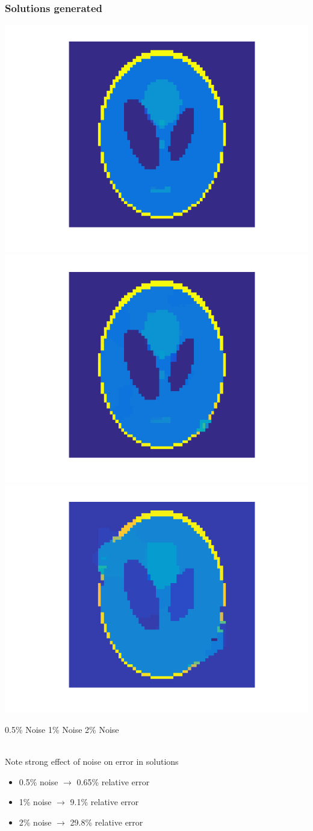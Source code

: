 \documentclass[12pt,t,xcolor=dvipsnames]{beamer}
\begin{document}
\begin{frame}
\frametitle{Solutions generated}

\hspace*{-1cm}
  \includegraphics[width=0.4\linewidth]{Solution_05}
  \includegraphics[width=0.4\linewidth]{Solution_1}
  \includegraphics[width=0.4\linewidth]{Solution_2}

0.5\% Noise \hfill 1\% Noise \hfill 2\% Noise

\ \\[12pt]
  Note strong effect of noise on error in solutions
  \begin{itemize}
    \item 0.5\% noise $\rightarrow$ 0.65\% relative error
    \item 1\% noise $\rightarrow$ 9.1\% relative error
    \item 2\% noise $\rightarrow$ 29.8\% relative error
  \end{itemize}
  

\end{frame}
\end{document}
